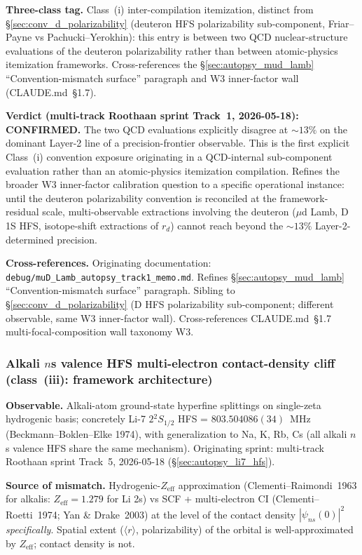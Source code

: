 \documentclass[11pt]{article}
\begin{document}
\textbf{Three-class tag.}  Class~(i) inter-compilation itemization,
distinct from \S\ref{sec:conv_d_polarizability} (deuteron HFS
polarizability sub-component, Friar--Payne vs Pachucki--Yerokhin):
this entry is between two QCD nuclear-structure evaluations of
the deuteron polarizability rather than between atomic-physics
itemization frameworks.  Cross-references the
\S\ref{sec:autopsy_mud_lamb} ``Convention-mismatch surface''
paragraph and W3 inner-factor wall (CLAUDE.md~\S1.7).

\textbf{Verdict (multi-track Roothaan sprint Track~1, 2026-05-18):
CONFIRMED.}  The two QCD evaluations explicitly disagree at $\sim
13\%$ on the dominant Layer-2 line of a precision-frontier
observable.  This is the first explicit Class~(i) convention
exposure originating in a QCD-internal sub-component evaluation
rather than an atomic-physics itemization compilation.  Refines
the broader W3 inner-factor calibration question to a specific
operational instance: until the deuteron polarizability convention
is reconciled at the framework-residual scale, multi-observable
extractions involving the deuteron ($\mu$d Lamb, D 1S HFS,
isotope-shift extractions of $r_d$) cannot reach beyond the
$\sim 13\%$ Layer-2-determined precision.

\textbf{Cross-references.}  Originating documentation:
\texttt{debug/muD\_Lamb\_autopsy\_track1\_memo.md}.  Refines
\S\ref{sec:autopsy_mud_lamb} ``Convention-mismatch surface''
paragraph.  Sibling to \S\ref{sec:conv_d_polarizability}
(D HFS polarizability sub-component; different observable, same
W3 inner-factor wall).  Cross-references CLAUDE.md~\S1.7
multi-focal-composition wall taxonomy W3.

\subsubsection{Alkali $n$s valence HFS multi-electron contact-density
cliff (class~(iii): framework architecture)}
\label{sec:conv_alkali_hfs}

\textbf{Observable.}  Alkali-atom ground-state hyperfine splittings on
single-zeta hydrogenic basis; concretely Li-7 $2{}^2S_{1/2}$
HFS = $803.504086(34)$~MHz (Beckmann--Boklen--Elke 1974), with
generalization to Na, K, Rb, Cs (all alkali $n$s valence HFS share
the same mechanism).  Originating sprint: multi-track Roothaan
sprint Track~5, 2026-05-18 (\S\ref{sec:autopsy_li7_hfs}).

\textbf{Source of mismatch.}  Hydrogenic-$Z_\text{eff}$ approximation
(Clementi--Raimondi~1963 for alkalis: $Z_\text{eff} = 1.279$ for
Li 2s) vs SCF + multi-electron CI (Clementi--Roetti~1974;
Yan \& Drake~2003) at the level of the contact density
$|\psi_{ns}(0)|^2$ \emph{specifically}.  Spatial extent
($\langle r \rangle$, polarizability) of the orbital is well-approximated
by $Z_\text{eff}$; contact density is not.
\end{document}
